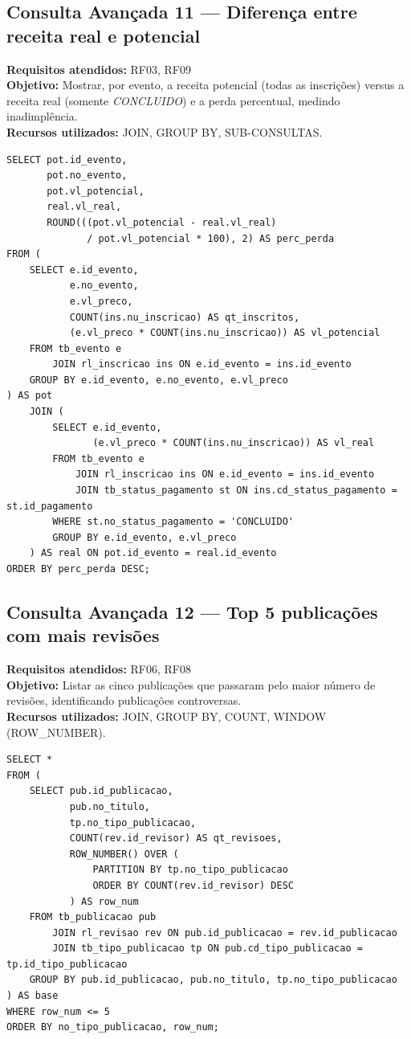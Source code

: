 \documentclass[12pt,a4paper]{article}
\begin{document}
\subsection{Consulta Avançada 11 --- Diferença entre receita real e potencial}
\textbf{Requisitos atendidos:} RF03, RF09 \\
\textbf{Objetivo:} Mostrar, por evento, a receita potencial (todas as inscrições) versus a receita real (somente \textit{CONCLUIDO}) e a perda percentual, medindo inadimplência. \\
\textbf{Recursos utilizados:} JOIN, GROUP BY, SUB-CONSULTAS.
\begin{lstlisting}[caption={QA11 --- Diferença entre receita real e potencial.}]
SELECT pot.id_evento,
       pot.no_evento,
       pot.vl_potencial,
       real.vl_real,
       ROUND(((pot.vl_potencial - real.vl_real)
              / pot.vl_potencial * 100), 2) AS perc_perda
FROM (
    SELECT e.id_evento,
           e.no_evento,
           e.vl_preco,
           COUNT(ins.nu_inscricao) AS qt_inscritos,
           (e.vl_preco * COUNT(ins.nu_inscricao)) AS vl_potencial
    FROM tb_evento e
        JOIN rl_inscricao ins ON e.id_evento = ins.id_evento
    GROUP BY e.id_evento, e.no_evento, e.vl_preco
) AS pot
    JOIN (
        SELECT e.id_evento,
               (e.vl_preco * COUNT(ins.nu_inscricao)) AS vl_real
        FROM tb_evento e
            JOIN rl_inscricao ins ON e.id_evento = ins.id_evento
            JOIN tb_status_pagamento st ON ins.cd_status_pagamento = st.id_pagamento
        WHERE st.no_status_pagamento = 'CONCLUIDO'
        GROUP BY e.id_evento, e.vl_preco
    ) AS real ON pot.id_evento = real.id_evento
ORDER BY perc_perda DESC;
\end{lstlisting}

\subsection{Consulta Avançada 12 --- Top 5 publicações com mais revisões}
\textbf{Requisitos atendidos:} RF06, RF08 \\
\textbf{Objetivo:} Listar as cinco publicações que passaram pelo maior número de revisões, identificando publicações controversas. \\
\textbf{Recursos utilizados:} JOIN, GROUP BY, COUNT, WINDOW (ROW\_NUMBER).
\begin{lstlisting}[caption={QA12 --- Top 5 publicações com mais revisões (por tipo).}]
SELECT *
FROM (
    SELECT pub.id_publicacao,
           pub.no_titulo,
           tp.no_tipo_publicacao,
           COUNT(rev.id_revisor) AS qt_revisoes,
           ROW_NUMBER() OVER (
               PARTITION BY tp.no_tipo_publicacao
               ORDER BY COUNT(rev.id_revisor) DESC
           ) AS row_num
    FROM tb_publicacao pub
        JOIN rl_revisao rev ON pub.id_publicacao = rev.id_publicacao
        JOIN tb_tipo_publicacao tp ON pub.cd_tipo_publicacao = tp.id_tipo_publicacao
    GROUP BY pub.id_publicacao, pub.no_titulo, tp.no_tipo_publicacao
) AS base
WHERE row_num <= 5
ORDER BY no_tipo_publicacao, row_num;
\end{lstlisting}
\end{document}
